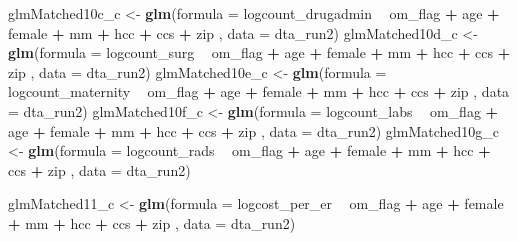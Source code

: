 \documentclass[]{article}
\newenvironment{Shaded}{\begin{snugshade}}{\end{snugshade}}
\newcommand{\KeywordTok}[1]{\textcolor[rgb]{0.13,0.29,0.53}{\textbf{#1}}}
\newcommand{\DataTypeTok}[1]{\textcolor[rgb]{0.13,0.29,0.53}{#1}}
\newcommand{\StringTok}[1]{\textcolor[rgb]{0.31,0.60,0.02}{#1}}
\newcommand{\OperatorTok}[1]{\textcolor[rgb]{0.81,0.36,0.00}{\textbf{#1}}}
\newcommand{\NormalTok}[1]{#1}
\begin{document}
\begin{Shaded}
\begin{Highlighting}[]
\NormalTok{glmMatched10c_c <-}\StringTok{ }\KeywordTok{glm}\NormalTok{(}\DataTypeTok{formula =}\NormalTok{ logcount_drugadmin }\OperatorTok{~}\StringTok{ }\NormalTok{om_flag }\OperatorTok{+}\StringTok{ }\NormalTok{age }\OperatorTok{+}\StringTok{ }\NormalTok{female }\OperatorTok{+}\StringTok{ }\NormalTok{mm }\OperatorTok{+}\StringTok{ }\NormalTok{hcc }\OperatorTok{+}\StringTok{ }\NormalTok{ccs }\OperatorTok{+}\StringTok{ }\NormalTok{zip ,}
                     \DataTypeTok{data    =}\NormalTok{ dta_run2)}
\NormalTok{glmMatched10d_c <-}\StringTok{ }\KeywordTok{glm}\NormalTok{(}\DataTypeTok{formula =}\NormalTok{ logcount_surg }\OperatorTok{~}\StringTok{ }\NormalTok{om_flag }\OperatorTok{+}\StringTok{ }\NormalTok{age }\OperatorTok{+}\StringTok{ }\NormalTok{female }\OperatorTok{+}\StringTok{ }\NormalTok{mm }\OperatorTok{+}\StringTok{ }\NormalTok{hcc }\OperatorTok{+}\StringTok{ }\NormalTok{ccs }\OperatorTok{+}\StringTok{ }\NormalTok{zip ,}
                     \DataTypeTok{data    =}\NormalTok{ dta_run2)}
\NormalTok{glmMatched10e_c <-}\StringTok{ }\KeywordTok{glm}\NormalTok{(}\DataTypeTok{formula =}\NormalTok{ logcount_maternity }\OperatorTok{~}\StringTok{ }\NormalTok{om_flag }\OperatorTok{+}\StringTok{ }\NormalTok{age }\OperatorTok{+}\StringTok{ }\NormalTok{female }\OperatorTok{+}\StringTok{ }\NormalTok{mm }\OperatorTok{+}\StringTok{ }\NormalTok{hcc }\OperatorTok{+}\StringTok{ }\NormalTok{ccs }\OperatorTok{+}\StringTok{ }\NormalTok{zip ,}
                     \DataTypeTok{data    =}\NormalTok{ dta_run2)}
\NormalTok{glmMatched10f_c <-}\StringTok{ }\KeywordTok{glm}\NormalTok{(}\DataTypeTok{formula =}\NormalTok{ logcount_labs }\OperatorTok{~}\StringTok{ }\NormalTok{om_flag }\OperatorTok{+}\StringTok{ }\NormalTok{age }\OperatorTok{+}\StringTok{ }\NormalTok{female }\OperatorTok{+}\StringTok{ }\NormalTok{mm }\OperatorTok{+}\StringTok{ }\NormalTok{hcc }\OperatorTok{+}\StringTok{ }\NormalTok{ccs }\OperatorTok{+}\StringTok{ }\NormalTok{zip ,}
                     \DataTypeTok{data    =}\NormalTok{ dta_run2)}
\NormalTok{glmMatched10g_c <-}\StringTok{ }\KeywordTok{glm}\NormalTok{(}\DataTypeTok{formula =}\NormalTok{ logcount_rads }\OperatorTok{~}\StringTok{ }\NormalTok{om_flag }\OperatorTok{+}\StringTok{ }\NormalTok{age }\OperatorTok{+}\StringTok{ }\NormalTok{female }\OperatorTok{+}\StringTok{ }\NormalTok{mm }\OperatorTok{+}\StringTok{ }\NormalTok{hcc }\OperatorTok{+}\StringTok{ }\NormalTok{ccs }\OperatorTok{+}\StringTok{ }\NormalTok{zip ,}
                     \DataTypeTok{data    =}\NormalTok{ dta_run2)}


\NormalTok{glmMatched11_c <-}\StringTok{ }\KeywordTok{glm}\NormalTok{(}\DataTypeTok{formula =}\NormalTok{ logcost_per_er }\OperatorTok{~}\StringTok{ }\NormalTok{om_flag }\OperatorTok{+}\StringTok{ }\NormalTok{age }\OperatorTok{+}\StringTok{ }\NormalTok{female }\OperatorTok{+}\StringTok{ }\NormalTok{mm }\OperatorTok{+}\StringTok{ }\NormalTok{hcc }\OperatorTok{+}\StringTok{ }\NormalTok{ccs }\OperatorTok{+}\StringTok{ }\NormalTok{zip ,}
                    \DataTypeTok{data    =}\NormalTok{ dta_run2)}


\end{Highlighting}
\end{Shaded}
\end{document}
